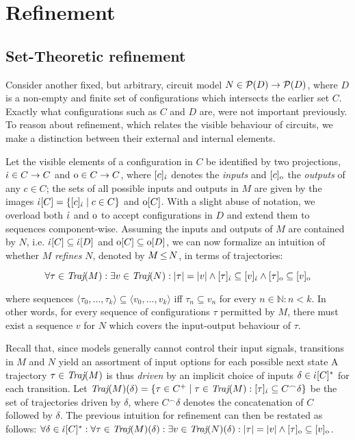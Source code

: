 \section{Refinement}

\subsection{Set-Theoretic refinement}

Consider another fixed, but arbitrary, circuit model $N \in \mathcal{P}(D) \rightarrow \mathcal{P}(D)$, where $D$ is a non-empty and finite set of configurations which intersects the earlier set $C$. Exactly what configurations such as $C$ and $D$ are, were not important previously. To reason about refinement, which relates the visible behaviour of circuits, we make a distinction between their external and internal elements.


Let the visible elements of a configuration in $C$ be identified by two projections, $\dot{\iota} \in C \rightarrow C$ and $\mathrm{o} \in C \rightarrow C$, where $[c]_{\dot{\iota}}$ denotes the \textit{inputs} and $[c]_{\mathrm{o}}$ the \textit{outputs} of any $c \in C$; the sets of all possible inputs and outputs in $M$ are given by the images $\dot{\iota}[C] = \{ [c]_{\dot{\iota}} \mid c \in C \}$ and $\mathrm{o}[C]$. With a slight abuse of notation, we overload both $\dot{\iota}$ and $\mathrm{o}$ to accept configurations in $D$ and extend them to sequences component-wise. Assuming the inputs and outputs of $M$ are contained by $N$, i.e. $\dot{\iota}[C] \subseteq \dot{\iota}[D]$ and $\mathrm{o}[C] \subseteq \mathrm{o}[D]$, we can now formalize an intuition of whether $M$ \textit{refines} $N$, denoted by $M \operatorname{\leq} N$, in terms of trajectories:

\begin{equation*}
\forall \tau \in \operatorname{\textit{Traj}}(M) : \exists v \in \operatorname{\textit{Traj}}(N) : | \tau | = | v | \wedge [\tau]_{\dot{\iota}} \subseteq [v]_{\dot{\iota}} \wedge [\tau]_{\mathrm{o}} \subseteq [v]_{\mathrm{o}}
\end{equation*}

\noindent where sequences $\langle \tau_{0}, \ldots, \tau_{k} \rangle \subseteq \langle v_{0}, \ldots, v_{k} \rangle$ iff $\tau_{n} \subseteq v_{n}$ for every $n \in \mathbb{N} : n < k$. In other words, for every sequence of configurations $\tau$ permitted by $M$, there must exist a sequence $v$ for $N$ which covers the input-output behaviour of $\tau$.

Recall that, since models generally cannot control their input signals, transitions in $M$ and $N$ yield an assortment of input options for each possible next state A trajectory $\tau \in \operatorname{\textit{Traj}}(M)$ is thus \textit{driven} by an implicit choice of inputs $\delta \in \dot{\iota}[C]^{*}$ for each transition. Let $\operatorname{\textit{Traj}}(M)(\delta) = \{ \tau \in C^{+} \mid \tau \in \operatorname{\textit{Traj}}(M) : [\tau]_{\dot{\iota}} \subseteq C^{\frown}\delta \}$ be the set of trajectories driven by $\delta$, where $C^{\frown}\delta$ denotes the concatenation of $C$ followed by $\delta$. The previous intuition for refinement can then be restated as follows: $\forall \delta \in \dot{\iota}[C]^{*} : \forall \tau \in \operatorname{\textit{Traj}}(M)(\delta) : \exists v \in \operatorname{\textit{Traj}}(N)(\delta) : | \tau | = | v | \wedge [\tau]_{\mathrm{o}} \subseteq [v]_{\mathrm{o}}$.

